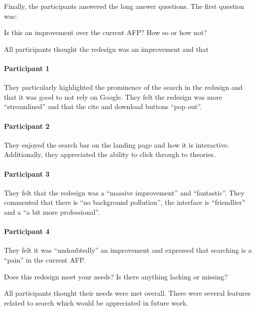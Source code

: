 \documentclass[bsc,frontabs,oneside,singlespacing,parskip,deptreport,logo]{infthesis}
\begin{document}
Finally, the participants answered the long answer questions. The first question was:

\begin{center}
    Is this an improvement over the current AFP? How so or how not?
\end{center}

All participants thought the redesign was an improvement and that 

\paragraph*{Participant 1}

They particularly highlighted the prominence of the search in the redesign and that it was good to not rely on Google. They felt the redesign was more ``streamlined'' and that the cite and download buttons ``pop out''.

\paragraph*{Participant 2}

They enjoyed the search bar on the landing page and how it is interactive. Additionally, they appreciated the ability to click through to theories.

\paragraph*{Participant 3}

They felt that the redesign was a ``massive improvement'' and ``fantastic''. They commented that there is ``no background pollution'', the interface is ``friendlier'' and a ``a bit more professional''. 

\paragraph*{Participant 4}

They felt it was ``undoubtedly'' an improvement and expressed that searching is a ``pain'' in the current AFP\@.
\bigskip

\begin{center}
    Does this redesign meet your needs? Is there anything lacking or missing? 
\end{center}

All participants thought their needs were met overall. There were several features related to search which would be appreciated in future work.
\end{document}
